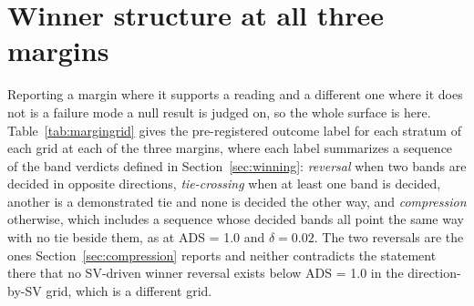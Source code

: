 \documentclass[11pt]{article}
\begin{document}
\appendix

\section{Winner structure at all three margins}
\label{app:margins}

Reporting a margin where it supports a reading and a different one where it
does not is a failure mode a null result is judged on, so the whole surface is
here. Table~\ref{tab:margingrid} gives the pre-registered outcome label for
each stratum of each grid at each of the three margins, where each label
summarizes a sequence of the band verdicts defined in
Section~\ref{sec:winning}: \emph{reversal} when two bands are decided in
opposite directions, \emph{tie-crossing} when at least one band is decided,
another is a demonstrated tie and none is decided the other way, and
\emph{compression} otherwise, which includes a sequence whose decided bands
all point the same way with no tie beside them, as at ADS = 1.0 and
$\delta = 0.02$. The two reversals are the ones
Section~\ref{sec:compression} reports and neither contradicts the statement
there that no SV-driven winner reversal exists below ADS = 1.0 in the
direction-by-SV grid, which is a different grid.
\end{document}

